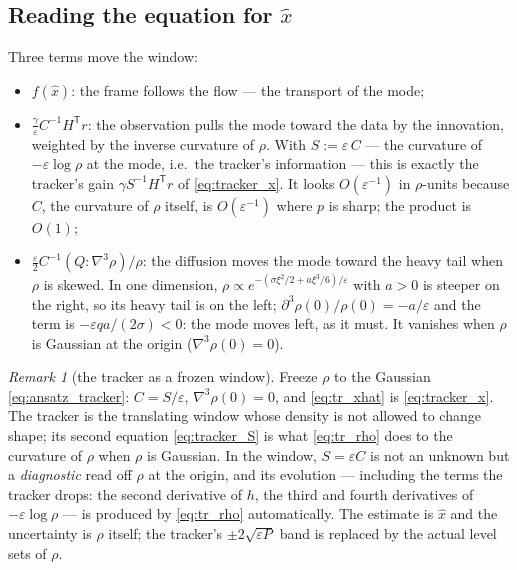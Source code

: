 \documentclass[11pt,a4paper]{article}
\newcommand{\T}{^{\mathsf T}}
\newcommand{\xh}{\hat{x}}
\newcommand{\eps}{\varepsilon}
\newcommand{\grad}{\nabla}
\theoremstyle{plain}
\theoremstyle{definition}
\theoremstyle{remark}
\newtheorem{remark}{Remark}
\begin{document}
\subsection{Reading the equation for \texorpdfstring{$\xh$}{xhat}}

Three terms move the window:
\begin{itemize}[leftmargin=1.5em]
  \item $f(\xh)$: the frame follows the flow --- the transport of the mode;
  \item $\tfrac\gamma\eps C^{-1}H\T r$: the observation pulls the mode toward the data by the innovation, weighted by the inverse curvature of $\rho$. With $S := \eps\,C$ --- the curvature of $-\eps\log\rho$ at the mode, i.e.\ the tracker's information --- this is exactly the tracker's gain $\gamma S^{-1}H\T r$ of \eqref{eq:tracker_x}. It looks $O(\eps^{-1})$ in $\rho$-units because $C$, the curvature of $\rho$ itself, is $O(\eps^{-1})$ where $p$ is sharp; the product is $O(1)$;
  \item $\tfrac\eps2C^{-1}(Q\!:\!\grad^3\rho)/\rho$: the diffusion moves the mode toward the heavy tail when $\rho$ is skewed. In one dimension, $\rho\propto e^{-(\sigma\xi^2/2 + a\xi^3/6)/\eps}$ with $a>0$ is steeper on the right, so its heavy tail is on the left; $\partial^3\rho(0)/\rho(0) = -a/\eps$ and the term is $-\eps qa/(2\sigma)<0$: the mode moves left, as it must. It vanishes when $\rho$ is Gaussian at the origin ($\grad^3\rho(0)=0$).
\end{itemize}

\begin{remark}[the tracker as a frozen window]
Freeze $\rho$ to the Gaussian \eqref{eq:ansatz_tracker}: $C = S/\eps$, $\grad^3\rho(0)=0$, and \eqref{eq:tr_xhat} is \eqref{eq:tracker_x}. The tracker is the translating window whose density is not allowed to change shape; its second equation \eqref{eq:tracker_S} is what \eqref{eq:tr_rho} does to the curvature of $\rho$ when $\rho$ is Gaussian. In the window, $S=\eps C$ is not an unknown but a \emph{diagnostic} read off $\rho$ at the origin, and its evolution --- including the terms the tracker drops: the second derivative of $h$, the third and fourth derivatives of $-\eps\log\rho$ --- is produced by \eqref{eq:tr_rho} automatically. The estimate is $\xh$ and the uncertainty is $\rho$ itself; the tracker's $\pm2\sqrt{\eps P}$ band is replaced by the actual level sets of $\rho$.
\end{remark}
\end{document}
